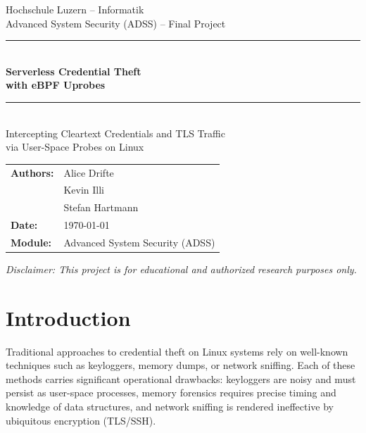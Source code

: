 \documentclass[11pt,a4paper]{article}
\begin{document}
\begin{titlepage}
    \centering
    \vspace*{2cm}

    {\Large Hochschule Luzern -- Informatik\\[0.3em]}
    {\large Advanced System Security (ADSS) -- Final Project\\[2cm]}

    \rule{\textwidth}{1pt}\\[0.6cm]
    {\Huge\bfseries Serverless Credential Theft\\with eBPF Uprobes\\[0.4cm]}
    \rule{\textwidth}{1pt}\\[1.5cm]

    {\large Intercepting Cleartext Credentials and TLS Traffic\\
    via User-Space Probes on Linux\\[3cm]}

    {\large
    \begin{tabular}{ll}
        \textbf{Authors:} & Alice Drifte \\
                           & Kevin Illi \\
                           & Stefan Hartmann \\[0.5em]
        \textbf{Date:}    & \today \\
        \textbf{Module:}  & Advanced System Security (ADSS) \\
    \end{tabular}
    }

    \vfill
    {\small\textit{Disclaimer: This project is for educational and authorized research purposes only.}}
\end{titlepage}

\newpage
\tableofcontents
\newpage

\section{Introduction}
\label{sec:introduction}

Traditional approaches to credential theft on Linux systems rely on well-known
techniques such as keyloggers, memory dumps, or network sniffing. Each of these
methods carries significant operational drawbacks: keyloggers are noisy and must
persist as user-space processes, memory forensics requires precise timing and
knowledge of data structures, and network sniffing is rendered ineffective by
ubiquitous encryption (TLS/SSH).
\end{document}
